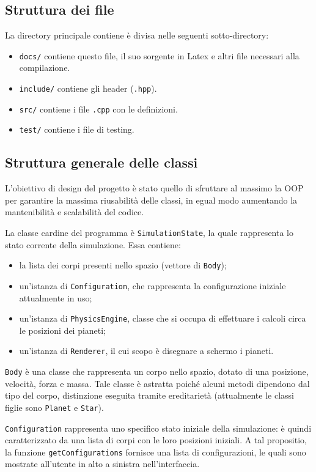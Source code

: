 \documentclass{article}
\begin{document}
\subsection{Struttura dei file}
La directory principale contiene è divisa nelle seguenti sotto-directory:
\begin{itemize}
    \item \verb|docs/| contiene questo file, il suo sorgente in Latex e altri file necessari alla compilazione.
    \item \verb|include/| contiene gli header (\verb|.hpp|).
    \item \verb|src/| contiene i file \verb|.cpp| con le definizioni.
    \item \verb|test/| contiene i file di testing.
\end{itemize}

\subsection{Struttura generale delle classi}

L'obiettivo di design del progetto è stato quello di sfruttare al massimo la OOP per garantire la massima riusabilità delle classi, in egual modo aumentando la mantenibilità e scalabilità del codice.

La classe cardine del programma è \verb|SimulationState|, la quale rappresenta lo stato corrente della simulazione. Essa contiene:
\begin{itemize}
    \item la lista dei corpi presenti nello spazio (vettore di \verb|Body|);
    \item un'istanza di \verb|Configuration|, che rappresenta la configurazione iniziale attualmente in uso;
    \item un'istanza di \verb|PhysicsEngine|, classe che si occupa di effettuare i calcoli circa le posizioni dei pianeti;
    \item un'istanza di \verb|Renderer|, il cui scopo è disegnare a schermo i pianeti.
\end{itemize}

\verb|Body| è una classe che rappresenta un corpo nello spazio, dotato di una posizione, velocità, forza e massa. Tale classe è astratta poiché alcuni metodi dipendono dal tipo del corpo, distinzione eseguita tramite ereditarietà (attualmente le classi figlie sono \verb|Planet| e \verb|Star|).

\verb|Configuration| rappresenta uno specifico stato iniziale della simulazione: è quindi caratterizzato da una lista di corpi con le loro posizioni iniziali. A tal propositio, la funzione \verb|getConfigurations| fornisce una lista di configurazioni, le quali sono mostrate all'utente in alto a sinistra nell'interfaccia.
\end{document}
